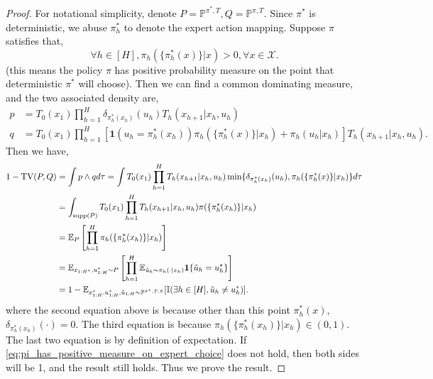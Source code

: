 \documentclass{article}
\begin{document}
\begin{proof}
    For notational simplicity, denote $P = \mathbb P^{\pi^*, T}, Q=\mathbb P^{\pi, T}$. Since $\pi^*$ is deterministic, we abuse $\pi_h^*$ to denote the expert action mapping. Suppose $\pi$ satisfies that,
    \begin{equation}\label{eq:pi_has_positive_measure_on_expert_choice}
        \forall h\in [H], \pi_h(\{\pi_h^*(x)\}|x)>0,\forall x\in \mathcal X.
    \end{equation}
    (this means the policy $\pi$ has positive probability measure on the point that deterministic $\pi^*$ will choose). Then we can find a common dominating measure, and the two associated density are,
    \begin{align*}
        p &= T_0(x_1)\prod_{h=1}^H\delta_{\pi_h^*(x_h)}(u_h)T_h(x_{h+1}|x_h,u_h)\\
        q&= T_0(x_1)\prod_{h=1}^H [\mathbf 1(u_h=\pi^*_h(x_h))\pi_h(\{\pi_h^*(x)\}|x_h)+\pi_h(u_h|x_h)]
        T_h(x_{h+1}|x_h,u_h).
    \end{align*}
    Then we have,
    \begin{align*}
        1-\textnormal{TV}(P,Q)&=\int p\wedge q d\tau=\int T_0(x_1)\prod_{h=1}^H T_h(x_{h+1}|x_h,u_h)\min\{\delta_{\pi_h^*(x_h)}(u_h), \pi_h(\{\pi_h^*(x)\}|x_h)\}d\tau\\
        &=\int_{\text{supp}(P)} T_0(x_1)\prod_{h=1}^H T_h(x_{h+1}|x_h, u_h)\pi(\{\pi_h^*(x_h)\}|x_h)\\
        &=\mathbb E_{P}\left[\prod_{h=1}^H \pi_h(\{\pi^*_h(x_h)\}|x_h)\right]\\
        &=\mathbb E_{x_{1:H^*}, u^*_{1:H}\sim P}\left[\prod_{h=1}^H \mathbb E_{\tilde u_h\sim \pi_h(\cdot|x_h)}\mathbf{1}\{\tilde u_h=u_h^*\}\right]
        \\&=1-\mathbb E_{x^*_{1:H},u_{1:H}^*, \tilde u_{1:H}\sim \mathbb P^{\pi^*, T, \hat \pi}}
    [\mathbb I(\exists h\in [H], \tilde u_h\neq u_h^*)].
    \end{align*}
where the second equation above is because other than this point $\pi_h^*(x)$, $\delta_{\pi^*_h(x_h)}(\cdot)=0$. The third equation is because $\pi_h(\{\pi^*_h(x_h)\}|x_h)\in(0,1)$. The last two equation is by definition of expectation. If \cref{eq:pi_has_positive_measure_on_expert_choice} does not hold, then both sides will be 1, and the result still holds. Thus we prove the result.
\end{proof}
\end{document}
